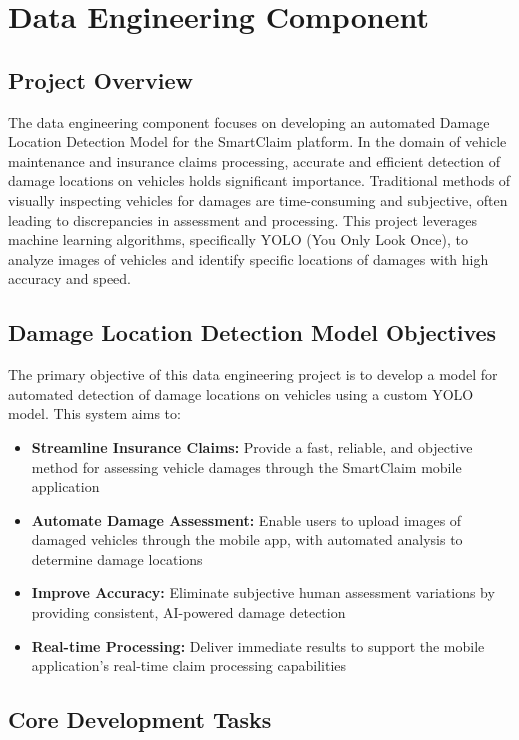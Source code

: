 \documentclass[12pt,a4paper]{report}
\begin{document}
\section{Data Engineering Component}

\subsection{Project Overview}

The data engineering component focuses on developing an automated Damage Location Detection Model for the SmartClaim platform. In the domain of vehicle maintenance and insurance claims processing, accurate and efficient detection of damage locations on vehicles holds significant importance. Traditional methods of visually inspecting vehicles for damages are time-consuming and subjective, often leading to discrepancies in assessment and processing. This project leverages machine learning algorithms, specifically YOLO (You Only Look Once), to analyze images of vehicles and identify specific locations of damages with high accuracy and speed.

\subsection{Damage Location Detection Model Objectives}

The primary objective of this data engineering project is to develop a model for automated detection of damage locations on vehicles using a custom YOLO model. This system aims to:

\begin{itemize}
    \item \textbf{Streamline Insurance Claims:} Provide a fast, reliable, and objective method for assessing vehicle damages through the SmartClaim mobile application
    \item \textbf{Automate Damage Assessment:} Enable users to upload images of damaged vehicles through the mobile app, with automated analysis to determine damage locations
    \item \textbf{Improve Accuracy:} Eliminate subjective human assessment variations by providing consistent, AI-powered damage detection
    \item \textbf{Real-time Processing:} Deliver immediate results to support the mobile application's real-time claim processing capabilities
\end{itemize}


\subsection{Core Development Tasks}
\end{document}
